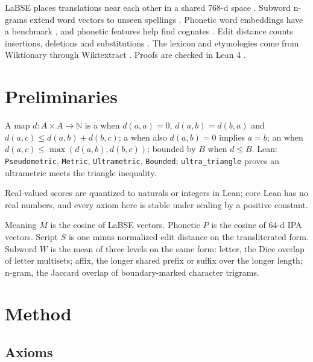 \documentclass[11pt]{article}
\begin{document}
LaBSE places translations near each other in a shared 768-d space \autocite{feng2020labse}. Subword n-grams extend word vectors to unseen spellings \autocite{bojanowski2016fasttext}. Phonetic word embeddings have a benchmark \autocite{zouhar2023pwesuite}, and phonetic features help find cognates \autocite{rama2016siamese}. Edit distance counts insertions, deletions and substitutions \autocite{levenshtein1966binary}. The lexicon and etymologies come from Wiktionary \autocite{meyer2012wiktionary} through Wiktextract \autocite{ylonen2022wiktextract}. Proofs are checked in Lean 4 \autocite{demoura2021lean4}.

\section{Preliminaries}
\label{sec:prelim}

\begin{definition}
\label{def:axioms}
A map $d:A\times A\to\mathbb{N}$ is a  when $d(a,a)=0$, $d(a,b)=d(b,a)$ and $d(a,c)\le d(a,b)+d(b,c)$; a  when also $d(a,b)=0$ implies $a=b$; an  when $d(a,c)\le\max(d(a,b),d(b,c))$; bounded by $B$ when $d\le B$. Lean: \texttt{Pseudometric}, \texttt{Metric}, \texttt{Ultrametric}, \texttt{Bounded}; \texttt{ultra\_triangle} proves an ultrametric meets the triangle inequality.
\end{definition}

Real-valued scores are quantized to naturals or integers in Lean; core Lean has no real numbers, and every axiom here is stable under scaling by a positive constant.

\begin{definition}[Axes]
\label{def:axes}
Meaning $M$ is the cosine of LaBSE vectors. Phonetic $P$ is the cosine of 64-d IPA vectors. Script $S$ is one minus normalized edit distance on the transliterated form. Subword $W$ is the mean of three levels on the same form: letter, the Dice overlap of letter multisets; affix, the longer shared prefix or suffix over the longer length; n-gram, the Jaccard overlap of boundary-marked character trigrams.
\end{definition}

\section{Method}
\label{sec:method}

\subsection{Axioms}
\end{document}
